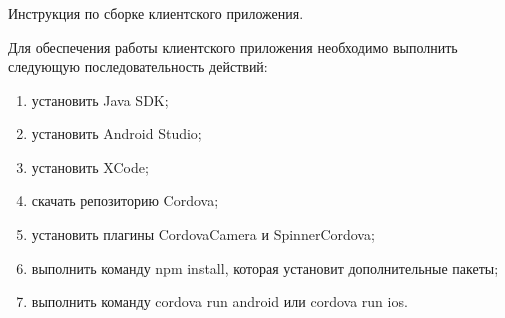 \subsubsection{}Инструкция по сборке клиентского приложения.


Для обеспечения работы клиентского приложения необходимо выполнить следующую последовательность действий:
\begin{enumerate}
\item установить Java SDK;
\item установить Android Studio;
\item установить XCode;
\item скачать репозиторию Cordova;
\item установить плагины CordovaCamera и SpinnerCordova;
\item выполнить команду npm install, которая установит дополнительные пакеты;
\item выполнить команду cordova run android или cordova run ios.
\end{enumerate}